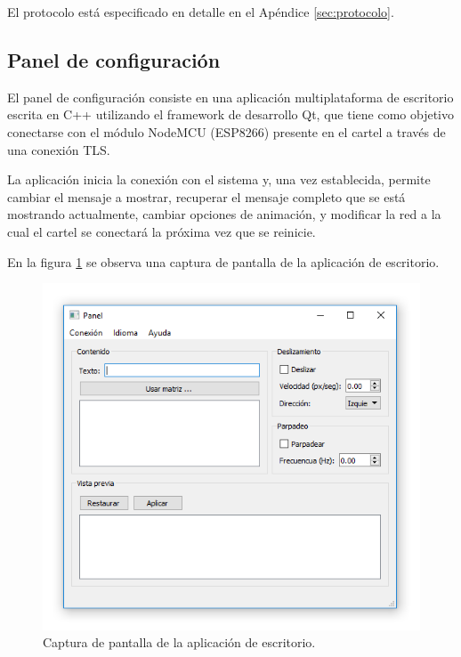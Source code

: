 El protocolo está especificado en detalle en el Apéndice \ref{sec:protocolo}.


\subsection{Panel de configuración}
El panel de configuración consiste en una aplicación multiplataforma de escritorio escrita en C++ utilizando el framework de desarrollo Qt, que tiene como objetivo conectarse con el módulo NodeMCU (ESP8266) presente en el cartel a través de una conexión TLS.

La aplicación inicia la conexión con el sistema y, una vez establecida, permite cambiar el mensaje a mostrar, recuperar el mensaje completo que se está mostrando actualmente, cambiar opciones de animación, y modificar la red a la cual el cartel se conectará la próxima vez que se reinicie.

En la figura \ref{fig:screenshot-panel} se observa una captura de pantalla de la aplicación de escritorio.

\begin{figure}[ht!]
	\begin{center}
		\centering
		\includegraphics[scale=0.8]{imagenes/screenshot-panel.png}
		\caption{Captura de pantalla de la aplicación de escritorio.}
		\label{fig:screenshot-panel}
	\end{center}
\end{figure}

